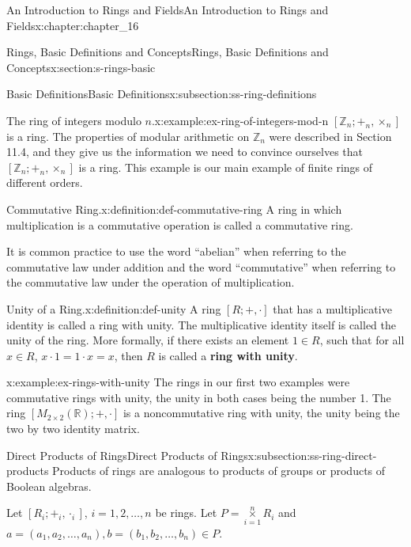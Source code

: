 \documentclass[twoside,10pt,]{book}
\newcommand{\terminology}[1]{\textbf{#1}}
\numberwithin{equation}{section}
\begin{document}
\begin{chapterptx}{An Introduction to Rings and Fields}{}{An Introduction to Rings and Fields}{}{}{x:chapter:chapter_16}
\begin{sectionptx}{Rings, Basic Definitions and Concepts}{}{Rings, Basic Definitions and Concepts}{}{}{x:section:s-rings-basic}
\begin{subsectionptx}{Basic Definitions}{}{Basic Definitions}{}{}{x:subsection:ss-ring-definitions}
\begin{example}{The ring of integers modulo \(n\).}{x:example:ex-ring-of-integers-mod-n}%
\(\left[\mathbb{Z}_n; +_n, \times_n\right]\) is a ring. The properties of modular arithmetic on \(\mathbb{Z}_n\) were described in Section 11.4, and they give us the information we need to convince ourselves that \(\left[\mathbb{Z}_n; +_n, \times_n\right]\) is a ring. This example is our main example of finite rings of different orders.%
\end{example}
\begin{definition}{Commutative Ring.}{x:definition:def-commutative-ring}%
%
A ring in which multiplication is a commutative operation is called a commutative ring.%
\end{definition}
It is common practice to use the word ``abelian'' when referring to the commutative law under addition and the word ``commutative'' when referring to the commutative law under the operation of multiplication.%
\begin{definition}{Unity of a Ring.}{x:definition:def-unity}%
%
%
A ring \([R; + , \cdot ]\) that has a multiplicative identity is called a ring with unity. The multiplicative identity itself is called the unity of the ring. More formally, if there exists an element \(1 \in R\), such that for all \(x \in R\), \(x\cdot 1 = 1\cdot x = x\), then \(R\) is called a \terminology{ring with unity}.%
\end{definition}
\begin{example}{}{x:example:ex-rings-with-unity}%
The rings in our first two examples were commutative rings with unity, the unity in both cases being the number 1. The ring \(\left[M_{2\times 2}(\mathbb{R}); + , \cdot \right]\) is a noncommutative ring with unity, the unity being the two by two identity matrix.%
\end{example}
\end{subsectionptx}
%
%
\typeout{************************************************}
\typeout{************************************************}
%
\begin{subsectionptx}{Direct Products of Rings}{}{Direct Products of Rings}{}{}{x:subsection:ss-ring-direct-products}
Products of rings are analogous to products of groups or products of Boolean algebras.%
\par
Let \([R_i; +_i, \cdot_i]\), \(i = 1, 2, \ldots , n\) be rings.  Let \(P=\underset{i=1}{\overset{n}{\times}}R_i\) and \(a = (a_1, a_2 , \ldots , a_n), b = (b_1, b_2, \ldots, b_n)\in P\).%

\end{subsectionptx}
\end{sectionptx}
\end{chapterptx}
\end{document}
